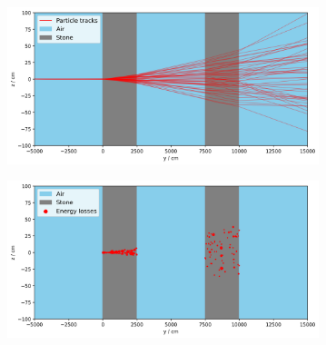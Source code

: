 \begin{frame}{}
\begin{minipage}[t][1cm][t]{\textwidth}
\begin{columns}[onlytextwidth]
\begin{column}{0.5\textwidth}
\begin{itemize}
            \end{itemize}
        \end{column}
        \begin{column}{0.5\textwidth}
            \begin{figure}
                \centering
                \includegraphics[width=0.85\textwidth]{plots/tracks.png}
            \end{figure}
            \vspace{-3mm}
            \begin{figure}
                \centering
                \includegraphics[width=0.85\textwidth]{plots/losses.png}
            \end{figure}
        \end{column}
    \end{columns}

  \end{minipage}
\end{frame}


